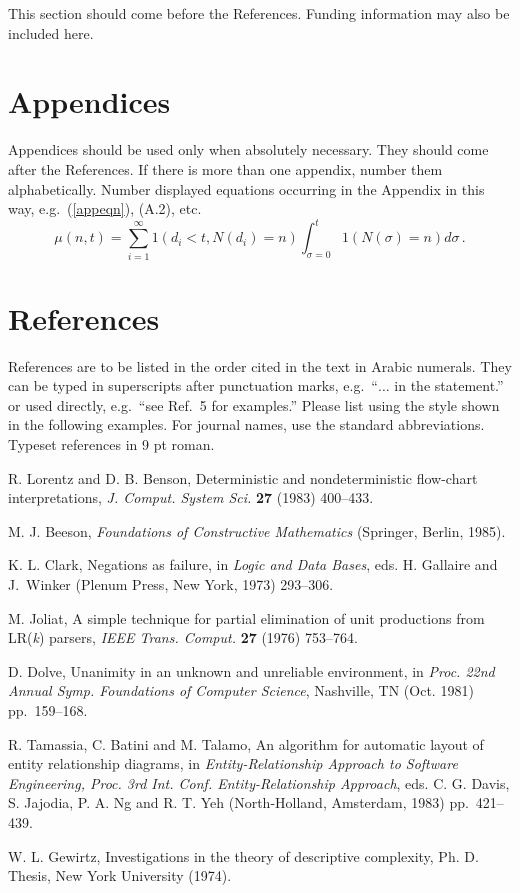 \documentclass{ws-ijcga}
\begin{document}
This section should come before the References. Funding
information may also be included here.

\appendix

\section{Appendices}

Appendices should be used only when absolutely necessary. They
should come after the References. If there is more than one
appendix, number them alphabetically. Number displayed equations
occurring in the Appendix in this way, e.g.~(\ref{appeqn}), (A.2),
etc.
\begin{equation}
\mu(n, t) = {\sum^\infty_{i=1} 1(d_i < t, N(d_i) 
= n)}{\int^t_{\sigma=0} 1(N(\sigma) = n)d\sigma}\,.
\label{appeqn}
\end{equation}

\section*{References}

References are to be listed in the order cited in the text in Arabic
numerals.  They can be typed in superscripts after punctuation marks,
e.g.~``$\ldots$ in the statement.\cite{dolve}'' or used directly,
e.g.~``see Ref.~5 for examples.'' Please list using the style shown in
the following examples.  For journal names, use the standard
abbreviations.  Typeset references in 9 pt roman.

\begin{thebibliography}{0}
R. Lorentz and D. B. Benson, Deterministic and nondeterministic
flow-chart interpretations, {\it J. Comput. System Sci.}
{\bf 27} (1983) 400--433.

M. J. Beeson, {\it Foundations of Constructive Mathematics}
(Springer, Berlin, 1985).

K. L. Clark, Negations as failure, in {\it Logic and Data
Bases}, eds. H. Gallaire and J.~Winker (Plenum Press, New York,
1973) 293--306.

M. Joliat, A simple technique for partial elimination of unit
productions from LR({\it k}) parsers, {\it IEEE Trans.
Comput.} {\bf 27} (1976) 753--764.

D. Dolve, Unanimity in an unknown and unreliable environment, in
{\it Proc. 22nd Annual Symp. Foundations of Computer
Science}, Nashville, TN (Oct. 1981) pp.~159--168.

R. Tamassia, C. Batini and M. Talamo, An algorithm for automatic
layout of entity relationship diagrams, in {\it
Entity-Relationship Approach to Software Engineering, Proc. 3rd
Int.  Conf. Entity-Relationship Approach}, eds. C. G. Davis,
S. Jajodia, P. A. Ng and R. T. Yeh (North-Holland, Amsterdam,
1983) pp.~421--439.

W. L. Gewirtz, Investigations in the theory of descriptive
complexity, Ph. D. Thesis, New York University (1974).
\end{thebibliography}
\end{document}
